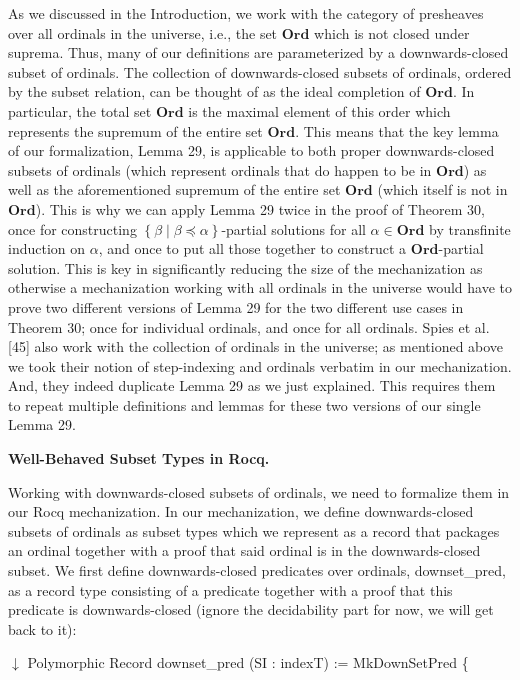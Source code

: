 \documentclass[10pt,a4paper]{article}
\begin{document}
 
As we discussed in the Introduction, we work with the category of presheaves over all ordinals in the universe, i.e., the set $\mathbf{Ord}$ which is not closed under suprema. Thus, many of our definitions are parameterized by a downwards-closed subset of ordinals. The collection of downwards-closed subsets of ordinals, ordered by the subset relation, can be thought of as the ideal completion of $\mathbf{Ord}$. In particular, the total set $\mathbf{Ord}$ is the maximal element of this order which represents the supremum of the entire set $\mathbf{Ord}$. This means that the key lemma of our formalization, Lemma 29, is applicable to both proper downwards-closed subsets of ordinals (which represent ordinals that do happen to be in $\mathbf{Ord}$) as well as the aforementioned supremum of the entire set $\mathbf{Ord}$ (which itself is not in $\mathbf{Ord}$). This is why we can apply Lemma 29 twice in the proof of Theorem 30, once for constructing $\left\{\beta\middle|\beta\preceq\alpha\right\}$-partial solutions for all $\alpha\in\mathbf{Ord}$ by transfinite induction on $\alpha$, and once to put all those together to construct a $\mathbf{Ord}$-partial solution. This is key in significantly reducing the size of the mechanization as otherwise a mechanization working with all ordinals in the universe would have to prove two different versions of Lemma 29 for the two different use cases in Theorem 30; once for individual ordinals, and once for all ordinals. Spies et al. [45] also work with the collection of ordinals in the universe; as mentioned above we took their notion of step-indexing and ordinals verbatim in our mechanization. And, they indeed duplicate Lemma 29 as we just explained. This requires them to repeat multiple definitions and lemmas for these two versions of our single Lemma 29.\par
 
 
 
 
\par\medskip\noindent\textbf{Well-Behaved Subset Types in Rocq.}\par
 
 
Working with downwards-closed subsets of ordinals, we need to formalize them in our Rocq mechanization. In our mechanization, we define downwards-closed subsets of ordinals as subset types which we represent as a record that packages an ordinal together with a proof that said ordinal is in the downwards-closed subset. We first define downwards-closed predicates over ordinals, downset\_pred, as a record type consisting of a predicate together with a proof that this predicate is downwards-closed (ignore the decidability part for now, we will get back to it):\par
  \ensuremath{\downarrow} 
 Polymorphic Record downset\_pred (SI : indexT) := MkDownSetPred \{ 
 
\end{document}
